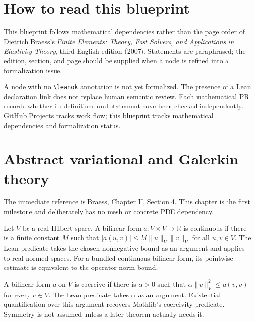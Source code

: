 \chapter{How to read this blueprint}

This blueprint follows mathematical dependencies rather than the page order of
Dietrich Braess's \emph{Finite Elements: Theory, Fast Solvers, and Applications
in Elasticity Theory}, third English edition (2007). Statements are paraphrased;
the edition, section, and page should be supplied when a node is refined into a
formalization issue.

A node with no \texttt{\textbackslash leanok} annotation is not yet formalized.
The presence of a Lean declaration link does not replace human semantic review.
Each mathematical PR records whether its definitions and statement have been
checked independently. GitHub Projects tracks work flow; this blueprint tracks
mathematical dependencies and formalization status.

\chapter{Abstract variational and Galerkin theory}

The immediate reference is Braess, Chapter II, Section 4. This chapter is the
first milestone and deliberately has no mesh or concrete PDE dependency.

\begin{definition}
  \label{def:continuous-bilinear-form}
  Let $V$ be a real Hilbert space. A bilinear form $a:V\times V\to\mathbb R$
  is continuous if there is a finite constant $M$ such that
  $|a(u,v)|\le M\|u\|_V\|v\|_V$ for all $u,v\in V$.
  The Lean predicate takes the chosen nonnegative bound as an argument and
  applies to real normed spaces. For a bundled continuous bilinear form,
  its pointwise estimate is equivalent to the operator-norm bound.
\end{definition}

\begin{definition}
  \label{def:coercive-bilinear-form}
  A bilinear form $a$ on $V$ is coercive if there is $\alpha>0$ such that
  $\alpha\|v\|_V^2\le a(v,v)$ for every $v\in V$.
  The Lean predicate takes $\alpha$ as an argument. Existential quantification
  over this argument recovers Mathlib's coercivity predicate.
  Symmetry is not assumed unless a later theorem actually needs it.
\end{definition}

